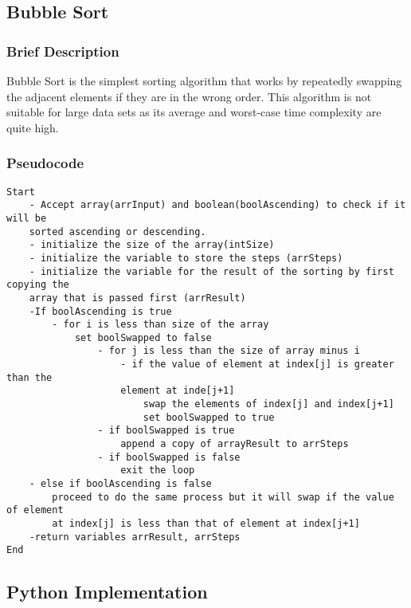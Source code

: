 \documentclass{article}
\begin{document}
\subsection{Bubble Sort}
\subsubsection*{Brief Description}
Bubble Sort is the simplest sorting algorithm that works by repeatedly swapping the adjacent elements if they are in the wrong order. This algorithm is not suitable for large data sets as its average and worst-case time complexity are quite high.
\subsubsection*{Pseudocode}
\begin{lstlisting}
Start
    - Accept array(arrInput) and boolean(boolAscending) to check if it will be 
    sorted ascending or descending.
    - initialize the size of the array(intSize)
    - initialize the variable to store the steps (arrSteps)
    - initialize the variable for the result of the sorting by first copying the 
    array that is passed first (arrResult)
    -If boolAscending is true
        - for i is less than size of the array
            set boolSwapped to false
                - for j is less than the size of array minus i
                    - if the value of element at index[j] is greater than the 
                    element at inde[j+1]
                        swap the elements of index[j] and index[j+1]
                        set boolSwapped to true
                - if boolSwapped is true
                    append a copy of arrayResult to arrSteps
                - if boolSwapped is false
                    exit the loop
    - else if boolAscending is false
        proceed to do the same process but it will swap if the value of element 
        at index[j] is less than that of element at index[j+1]
    -return variables arrResult, arrSteps
End
\end{lstlisting}


\subsection*{Python Implementation}
\end{document}
